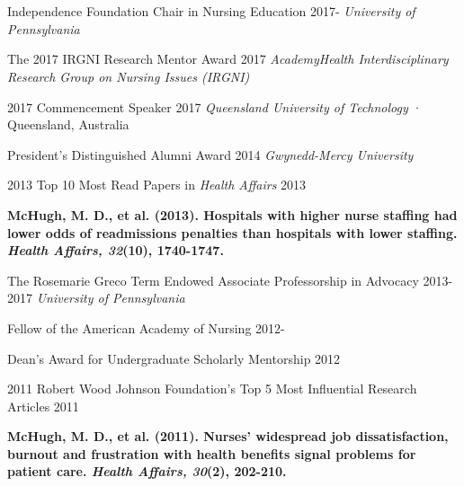 \documentclass[10pt,]{article}
\begin{document}
{{{{{{\section{\Large {}}

Independence Foundation Chair in Nursing Education \hfill {2017-{\small{}}} \newline
\hspace*{0.5cm} {\textit {University of Pennsylvania}}

The 2017 IRGNI Research Mentor Award  \hfill 2017	\newline
\hspace*{0.5cm} {\textit {AcademyHealth Interdisciplinary Research Group on Nursing Issues (IRGNI)}} 

2017 Commencement Speaker \hfill 2017	\newline
\hspace*{0.5cm} {\textit {Queensland University of Technology}} · Queensland, Australia

President's Distinguished Alumni Award \hfill 2014 \newline
\hspace*{0.5cm} {\textit {Gwynedd-Mercy University}}

2013	Top 10 Most Read Papers in {\textit {Health Affairs}} \hfill 2013
\vspace{-2.5mm}
\begin{adjustwidth}{1cm}{1cm}
{\footnotesize {\textbf {McHugh, M. D., et al. (2013). Hospitals with higher nurse staffing had lower odds of readmissions penalties than hospitals with lower staffing. {\textit {Health Affairs, 32}}(10), 1740-1747.}}}
\end{adjustwidth}

The Rosemarie Greco Term Endowed Associate Professorship in Advocacy \hfill 2013-2017 \newline
\hspace*{0.5cm} {\textit {University of Pennsylvania}}

Fellow of the American Academy of Nursing \hfill {2012-{\small{}}}

Dean’s Award for Undergraduate Scholarly Mentorship \hfill 2012	

2011 Robert Wood Johnson Foundation’s Top 5 Most Influential Research Articles \hfill 2011 
\vspace{-2.5mm}
\begin{adjustwidth}{1cm}{1cm}
{\footnotesize {\textbf {McHugh, M. D., et al. (2011). Nurses’ widespread job dissatisfaction, burnout and frustration with health benefits signal problems for patient care. {\textit {Health Affairs, 30}}(2), 202-210.}}}
\end{adjustwidth}

}}}}}}
\end{document}
